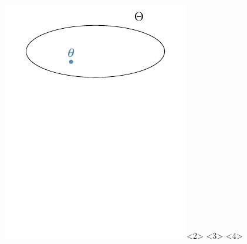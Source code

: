 \documentclass[aspectratio=169, table]{beamer}
\begin{document}
\begin{frame}
\begin{columns}
\begin{column}{.35\textwidth}
\begin{overlayarea}{\textwidth}{\textheight}
{	\includegraphics[]{animation/spaces2.pdf}}<2>

\end{overlayarea}
\end{column}
\end{columns}
\end{frame}
\end{document}
